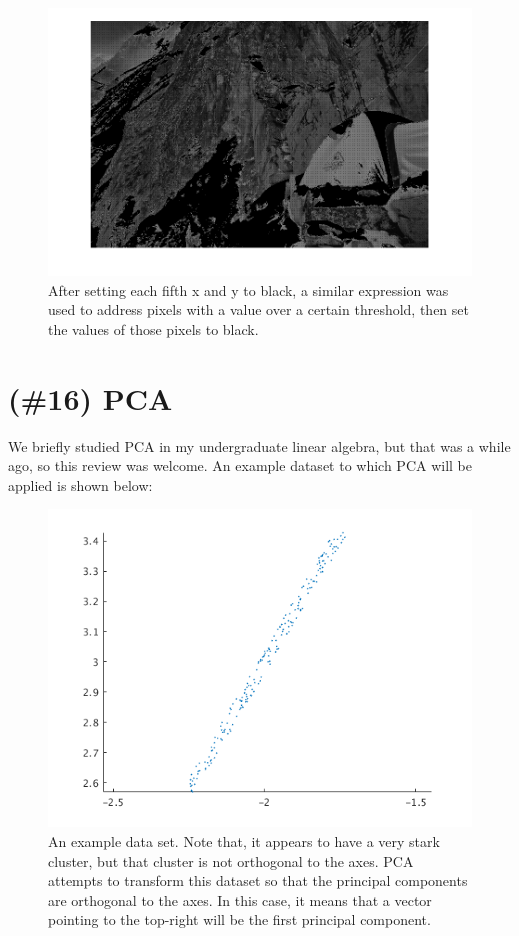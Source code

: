 \documentclass{article}
\begin{document}
\begin{figure}[!ht]
	\centering
	\includegraphics[width=120mm]{figs/tent_threshold.png}
	\caption{After setting each fifth x and y to black, a similar expression was 
        used to address pixels with a value over a certain threshold, then set 
        the values of those pixels to black.}
\end{figure}

\section{(\#16) PCA}

We briefly studied PCA in my undergraduate linear algebra, but that was a while 
ago, so this review was welcome. An example dataset to which PCA will be applied 
is shown below:

\begin{figure}[!ht]
	\centering
	\includegraphics[width=120mm]{figs/pca_none.png}
	\caption{An example data set. Note that, it appears to have a very stark 
        cluster, but that cluster is not orthogonal to the axes. PCA attempts 
        to transform this dataset so that the principal components are 
        orthogonal to the axes. In this case, it means that a vector pointing to 
        the top-right will be the first principal component.}
\end{figure}
\end{document}
